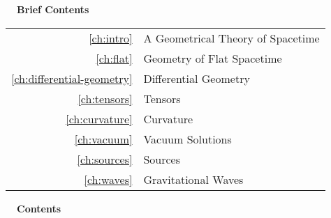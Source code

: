 \documentclass{genrel}
\begin{document}


\cleardoublepage





\pagebreak\vspace{100mm}

\hbox{}\noindent\huge\bfseries\sffamily{}\hspace{-2mm}\ \ Brief Contents\\
\hspace{-20mm}\noindent\mynormaltype\Large\sffamily{}\begin{tabular}{rl}
\ref{ch:intro} & A Geometrical Theory of Spacetime \quad \pageref{ch:intro}\\
\ref{ch:flat} & Geometry of Flat Spacetime \quad \pageref{ch:flat}\\
\ref{ch:differential-geometry} & Differential Geometry \quad \pageref{ch:differential-geometry}\\
\ref{ch:tensors} & Tensors \quad \pageref{ch:tensors}\\
\ref{ch:curvature} & Curvature \quad \pageref{ch:curvature}\\
\ref{ch:vacuum} & Vacuum Solutions \quad \pageref{ch:vacuum}\\
\ref{ch:sources} & Sources \quad \pageref{ch:sources}\\
\ref{ch:waves} & Gravitational Waves \quad \pageref{ch:waves}\\
\end{tabular}
\mynormaltype

\vspace{100mm}\pagebreak

\cleardoublepage

\noindent\huge\bfseries\sffamily{}\hspace{-2mm}\ \ Contents\\
\mynormaltype

\tableofcontents

\vspace{5mm}

\end{document}
